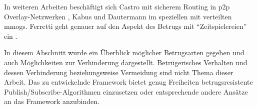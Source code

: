 In weiteren Arbeiten beschäftigt sich Castro mit sicherem Routing in p2p Overlay-Netzwerken \cite{Castro2002Secure}, Kabus \cite{Kabus2005Addressing} und Dautermann \cite{Dautermann2007} im speziellen mit verteilten \acp{mmog}. Ferretti geht genauer auf den Aspekt des Betrugs mit \enquote{Zeitspielereien} ein \cite{Ferretti2008Cheating}.

In diesem Abschnitt wurde ein Überblick möglicher Betrugsarten gegeben und auch Möglichkeiten zur Verhinderung dargestellt. Betrügerisches Verhalten und dessen Verhinderung beziehungsweise Vermeidung sind nicht Thema dieser Arbeit. Das zu entwickelnde Framework bietet genug Freiheiten betrugsresistente Publish/Subscribe-Algorithmen einzusetzen oder entsprechende andere Ansätze an das Framework anzubinden.
